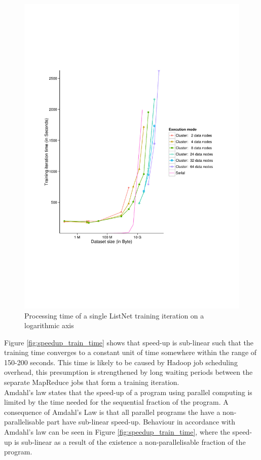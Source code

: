 \begin{figure}[!h]
\centering
\includegraphics[trim=0cm 5cm 0cm 5cm, scale=0.8]{gfx/time_single_logx.pdf}
\caption{Processing time of a single ListNet training iteration on a logarithmic axis}
\label{fig:listnet_train_time_log}
\end{figure}

Figure \ref{fig:speedup_train_time} shows that speed-up is sub-linear such that the training time converges to a constant unit of time somewhere within the range of 150-200 seconds. This time is likely to be caused by Hadoop job scheduling overhead, this presumption is strengthened by long waiting periods between the separate MapReduce jobs that form a training iteration.\\

Amdahl's law states that the speed-up of a program using parallel computing is limited by the time needed for the sequential fraction of the program. A consequence of Amdahl's Law is that all parallel programs the have a non-parallelisable part have sub-linear speed-up. Behaviour in accordance with Amdahl's law can be seen in Figure \ref{fig:speedup_train_time}, where the speed-up is sub-linear as a result of the existence a non-parallelisable fraction of the program.\\

